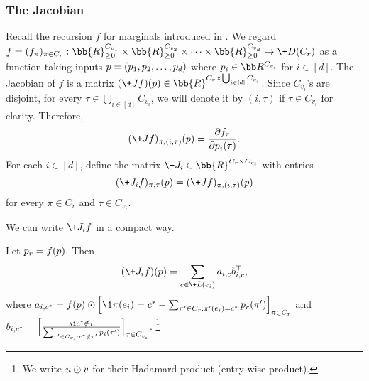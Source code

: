 \subsubsection{The Jacobian}
Recall the recursion $f$ for marginals introduced in . We regard $f=(f_\pi)_{\pi \in C_r}: \bb{R}_{\geq 0}^{C_{v_1}}\times \bb{R}_{\geq 0}^{C_{v_2}}\times \cdots \times \bb{R}_{\geq 0}^{C_{v_d}} \rightarrow \+D(C_{r})$
as a function taking inputs $\*p = (\*p_1, \*p_2, \dots, \*p_d)$ where $\*p_i\in \bb R^{C_{v_i}}$ for $i\in [d]$. The Jacobian of $f$ is a matrix $(\+J f)(\*p) \in \bb{R}^{C_r\times \bigcup_{i\in [d]} C_{v_i}}$. Since $C_{v_i}$'s are disjoint, for every $\tau \in \bigcup_{i\in [d]} C_{v_i}$, we will denote it by $(i,\tau)$ if $\tau\in C_{v_i}$ for clarity. Therefore, 
\begin{equation*}
    (\+J f)_{\pi,(i,\tau)}(\*p)= \frac{\partial f_\pi}{\partial \*p_{i}(\tau)}.
\end{equation*}
For each $i\in [d]$, define the matrix $\+J_i \in \bb{R}^{C_r\times C_{v_i}}$ with entries
\begin{equation*}
    (\+J_i f)_{\pi,\tau}(\*p) = (\+J f)_{\pi,(i,\tau)}(\*p)
\end{equation*}
for every $\pi\in C_r$ and $\tau\in C_{v_i}$. 

\bigskip
We can write $\+J_if$ in a compact way. 
\begin{proposition} 
Let $\*p_r = f(\*p)$. Then
\begin{align*}
    (\+J_i f)(\*p)=\sum_{c\in \+L(e_i)}\*a_{i,c} \*b_{i,c}^{\top},
\end{align*}
where $\*a_{i,c^*}=f(\*p) \odot \Big[\1{\pi(e_i)=c^*}-\sum_{\pi' \in C_{r}: \pi'(e_i)=c^*}\*p_r(\pi')\Big]_{\pi\in C_r}$
and $\*b_{i,c^*}=\Big[\frac{\1{c^*\notin \tau}}{\sum_{\tau' \in C_{v_i}: c^*\notin \tau'}\*p_i(\tau')} \Big]_{\tau\in C_{v_i}}$. \footnote{We write $\*u \odot \*v$ for their Hadamard product (entry-wise product).}
\end{proposition}

